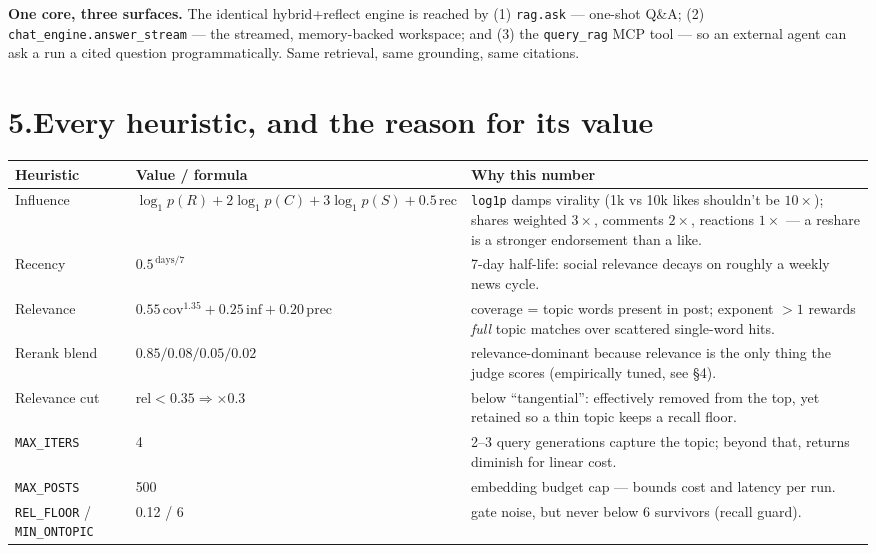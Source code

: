 \documentclass[11pt,a4paper]{article}
\newcommand{\code}[1]{\texttt{\small #1}}
\begin{document}
\smallskip
\noindent\textbf{One core, three surfaces.} The identical hybrid+reflect engine is reached by
(1) \code{rag.ask} --- one-shot Q\&A; (2) \code{chat\_engine.answer\_stream} --- the streamed,
memory-backed workspace; and (3) the \code{query\_rag} MCP tool --- so an external agent can ask a
run a cited question programmatically. Same retrieval, same grounding, same citations.

\section*{5.\quad Every heuristic, and the reason for its value}

\renewcommand{\arraystretch}{1.25}
\begin{center}
\small
\begin{tabular}{@{}>{\raggedright}p{3.0cm} l p{8.6cm}@{}}
\toprule
\textbf{Heuristic} & \textbf{Value / formula} & \textbf{Why this number} \\
\midrule
Influence &
$\log_1p(R){+}2\log_1p(C){+}3\log_1p(S){+}0.5\,\text{rec}$ &
\code{log1p} damps virality (1k vs 10k likes shouldn't be $10\times$); shares
weighted $3\times$, comments $2\times$, reactions $1\times$ --- a reshare is a
stronger endorsement than a like. \\
Recency & $0.5^{\,\text{days}/7}$ &
7-day half-life: social relevance decays on roughly a weekly news cycle. \\
Relevance & $0.55\,\text{cov}^{1.35}{+}0.25\,\text{inf}{+}0.20\,\text{prec}$ &
coverage = topic words present in post; exponent $>1$ rewards \emph{full} topic
matches over scattered single-word hits. \\
Rerank blend & $0.85/0.08/0.05/0.02$ &
relevance-dominant because relevance is the only thing the judge scores
(empirically tuned, see \S4). \\
Relevance cut & $\text{rel}<0.35\Rightarrow\times0.3$ &
below ``tangential'': effectively removed from the top, yet retained so a thin
topic keeps a recall floor. \\
\code{MAX\_ITERS} & 4 &
2--3 query generations capture the topic; beyond that, returns diminish for
linear cost. \\
\code{MAX\_POSTS} & 500 &
embedding budget cap --- bounds cost and latency per run. \\
\code{REL\_FLOOR} / \code{MIN\_ONTOPIC} & 0.12 / 6 &
gate noise, but never below 6 survivors (recall guard). \\

\end{tabular}
\end{center}
\end{document}
